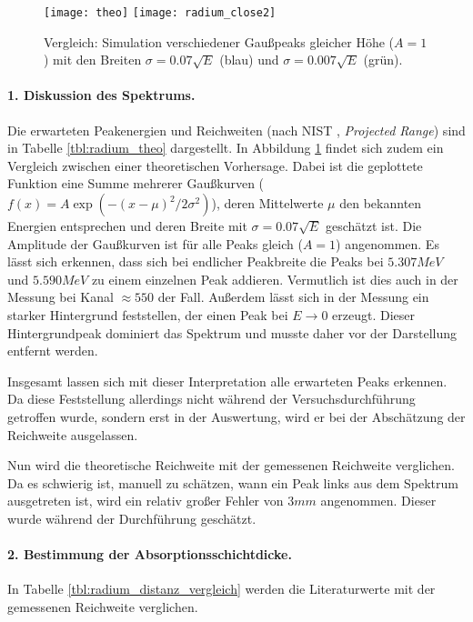 \documentclass{../Misc/MontavonLaTeX/Montavon}
\newcommand{\halfwidth}{0.48\textwidth}
\begin{document}
\begin{figure}[htbp]
\centering
\texttt{[image: theo]}
\texttt{[image: radium\_close2]}
\caption{Vergleich: Simulation verschiedener Gaußpeaks gleicher Höhe ($A = 1$) mit den Breiten $\sigma = 0.07 \sqrt{E}$ (blau) und $\sigma = 0.007 \sqrt{E}$ (grün).}
\label{fig:radium_theo}
\end{figure}

\paragraph{1. Diskussion des Spektrums.} 
Die erwarteten Peakenergien und Reichweiten (nach NIST \cite{nist_alpha}, \emph{Projected Range}) sind in Tabelle \ref{tbl:radium_theo} dargestellt. In Abbildung \ref{fig:radium_theo} findet sich zudem ein Vergleich zwischen einer theoretischen Vorhersage. Dabei ist die geplottete Funktion eine Summe mehrerer Gaußkurven ($f(x) = A \exp\left(-(x-\mu)^2 / 2 \sigma^2 \right)$), deren Mittelwerte $\mu$ den bekannten Energien entsprechen und deren Breite mit $\sigma = 0.07 \sqrt{E}$ geschätzt ist. Die Amplitude der Gaußkurven ist für alle Peaks gleich ($A = 1$) angenommen. Es lässt sich erkennen, dass sich bei endlicher Peakbreite die Peaks bei $5.307 \unit{MeV}$ und $5.590 \unit{MeV}$  zu einem einzelnen Peak addieren. Vermutlich ist dies auch in der Messung bei Kanal $\approx 550$ der Fall. 
Außerdem lässt sich in der Messung ein starker Hintergrund feststellen, der einen Peak bei $E \rightarrow 0$ erzeugt. Dieser Hintergrundpeak dominiert das Spektrum und musste daher vor der Darstellung entfernt werden.

Insgesamt lassen sich mit dieser Interpretation alle erwarteten Peaks erkennen. Da diese Feststellung allerdings nicht während der Versuchsdurchführung getroffen wurde, sondern erst in der Auswertung, wird er bei der Abschätzung der Reichweite ausgelassen.

Nun wird die theoretische Reichweite mit der gemessenen Reichweite verglichen. Da es schwierig ist, manuell zu schätzen, wann ein Peak links aus dem Spektrum ausgetreten ist, wird ein relativ großer Fehler von $3 \unit{mm}$ angenommen. Dieser wurde während der Durchführung geschätzt.

\paragraph{2. Bestimmung der Absorptionsschichtdicke.} 
In Tabelle \ref{tbl:radium_distanz_vergleich} werden die Literaturwerte mit der gemessenen Reichweite verglichen. 
\end{document}
